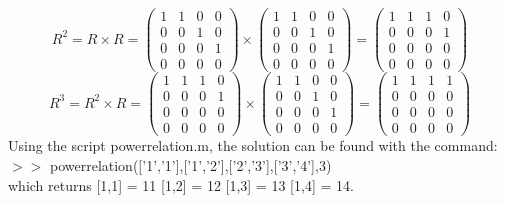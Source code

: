 \documentclass[11pt]{article}
\begin{document}
\begin{equation}
R^2 = R \times R = 
\begin{pmatrix}
1 & 1 & 0 & 0\\
0 & 0 & 1 & 0\\
0 & 0 & 0 & 1\\
0 & 0 & 0 & 0 
\end{pmatrix}
\times
\begin{pmatrix}
1 & 1 & 0 & 0\\
0 & 0 & 1 & 0\\
0 & 0 & 0 & 1\\
0 & 0 & 0 & 0 
\end{pmatrix}
=
\begin{pmatrix}
1 & 1 & 1 & 0\\
0 & 0 & 0 & 1\\
0 & 0 & 0 & 0\\
0 & 0 & 0 & 0 
\end{pmatrix}
\end{equation}
\begin{equation}
R^3 = R^2 \times R = 
\begin{pmatrix}
1 & 1 & 1 & 0\\
0 & 0 & 0 & 1\\
0 & 0 & 0 & 0\\
0 & 0 & 0 & 0 
\end{pmatrix}
\times
\begin{pmatrix}
1 & 1 & 0 & 0\\
0 & 0 & 1 & 0\\
0 & 0 & 0 & 1\\
0 & 0 & 0 & 0 
\end{pmatrix}
=
\begin{pmatrix}
1 & 1 & 1 & 1\\
0 & 0 & 0 & 0\\
0 & 0 & 0 & 0\\
0 & 0 & 0 & 0 
\end{pmatrix}
\end{equation}
Using the script powerrelation.m, the solution can be found with the command:\\
$>>$ powerrelation({['1','1'],['1','2'],['2','3'],['3','4']},3)\\
which returns [1,1] = 11 [1,2] = 12 [1,3] = 13 [1,4] = 14.
\end{document}
